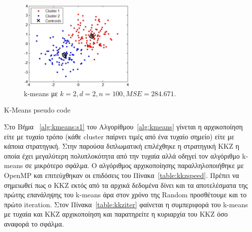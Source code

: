 \begin{figure}[ht]
  \centering
  \includegraphics[width=0.5\textwidth]{chapter3/kmeans.jpg}
  \caption{k-means με $k=2,d=2,n=100,MSE=284.671$. \cite{misc:kmeans}}
  \label{fig:kmeans}
\end{figure}

\begin{algorithm}[H]
\begin{algorithmic}[1]
 \label{alg:kmeans:s1}
     \label{alg:kmeans:s4}
         \label{alg:kmeans:s5}
    \EndFor
    \EndFor
\EndWhile
\end{algorithmic}
\caption{K-Means pseudo code}
\label{alg:kmeans}
\end{algorithm}

\newpage

\indent Στο Βήμα ~\ref{alg:kmeans:s1} του Αλγορίθμου~\ref{alg:kmeans} γίνεται η αρχικοποίηση είτε με τυχαίο τρόπο
(κάθε cluster παίρνει τιμές από ένα τυχαίο σημείο) είτε με κάποια στρατηγική. Στην παρούσα διπλωματική επιλέχθηκε
η στρατηγική KKZ \cite{kkz} η οποία έχει μεγαλύτερη πολυπλοκότητα από την τυχαία αλλά οδηγεί τον αλγόριθμο k-means
σε μικρότερο σφάλμα. Ο αλγόριθμος αρχικοποίησης παραλληλοποιήθηκε με OpenMP και επιτεύχθηκαν οι επιδόσεις του Πίνακα~\ref{table:kkzspeed}.
Πρέπει να σημειωθεί πως ο KKZ εκτός από τα αρχικά δεδομένα δίνει και τα αποτελέσματα της πρώτης επανάληψης του k-means άρα στον χρόνο της Random προσθέτουμε και το πρώτο iteration.
Στον Πίνακα~\ref{table:kkziter} φαίνεται η συμπεριφορά του k-means με τυχαία και KKZ αρχικοποίηση και παρατηρείτε η κυριαρχία
του KKZ όσο αναφορά το σφάλμα.


